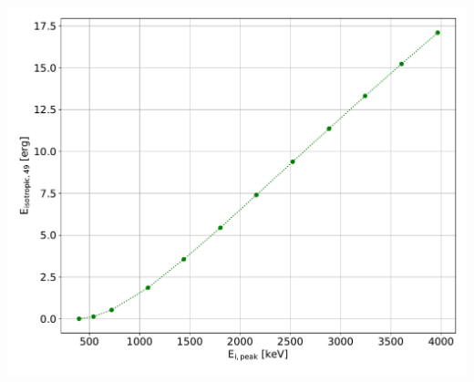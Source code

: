 \documentclass[10pt,report]{article}
\begin{document}
	\begin{minipage}[r]{0.48\textwidth}
		\centering
		\includegraphics[width=\textwidth]{../TI/Ep0__eipeak_eisotropic}
	\end{minipage}%

\end{document}
